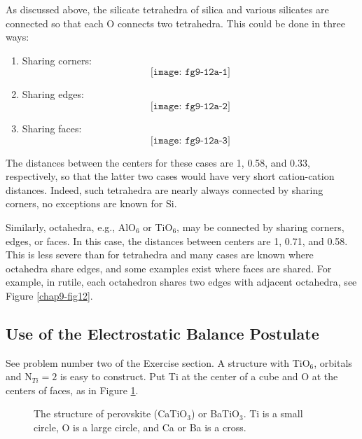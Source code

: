 As discussed above, the silicate tetrahedra of silica and various silicates 
are connected so that each O connects two tetrahedra.  This could be done 
in three ways:
\begin{enumerate}
\item Sharing corners:
\begin{equation}
\texttt{[image: fg9-12a-1]}
\end{equation}
\item Sharing edges:
\begin{equation}
\texttt{[image: fg9-12a-2]}
\end{equation}
\item Sharing faces:
\begin{equation}
\texttt{[image: fg9-12a-3]}
\end{equation}
\end{enumerate}
The distances between the centers for these cases are 1, 0.58, and 0.33, 
respectively, so that the latter two cases would have very short 
cation-cation distances.  Indeed, such tetrahedra are nearly always 
connected by sharing corners, no exceptions are known for Si.

Similarly, octahedra, e.g., AlO$_6$ or TiO$_6$, may be connected by
sharing corners, edges, or faces.  In this case, the distances between
centers are 1, 0.71, and 0.58.  This is less severe than for
tetrahedra and many cases are known where octahedra share edges, and
some examples exist where faces are shared.  For example, in rutile,
each octahedron shares two edges with adjacent octahedra, see Figure
\ref{chap9-fig12}.

\subsection{Use of the Electrostatic Balance Postulate}

See problem number two of the Exercise section.  A structure with
TiO$_6$, orbitals and N$_{Ti} = 2$ is easy to construct.  Put Ti at
the center of a cube and O at the centers of faces, as in Figure
\ref{chap9-fig13}.

\begin{figure}
\caption{The structure of perovskite (CaTiO$_3$) or BaTiO$_3$.
Ti is a small circle, O is a large circle, and Ca or Ba is a cross.}
\label{chap9-fig13}
\end{figure}


